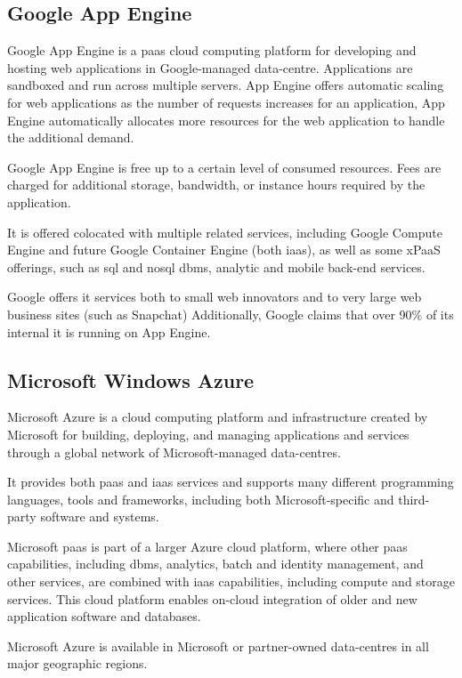 \subsection*{Google App Engine}
\label{sec:problemSpace-cloudPlatform-gae}
Google App Engine is a \ac{paas} cloud computing platform for developing and hosting web applications
in Google-managed data-centre. Applications are sandboxed and run across multiple servers. App Engine
offers automatic scaling for web applications as the number of requests increases for an application,
App Engine automatically allocates more resources for the web application to handle the additional
demand.

Google App Engine is free up to a certain level of consumed resources. Fees are charged for additional
storage, bandwidth, or instance hours required by the application.

It is offered colocated with multiple related services, including Google Compute Engine and future
Google Container Engine (both \ac{iaas}), as well as some xPaaS offerings, such as \acs{sql} and
\acs{nosql} \acs{dbms}, analytic and mobile back-end services.

Google offers it services both to small web innovators and to very large web business sites (such as
Snapchat) Additionally, Google claims that over 90\% of its internal \acs{it} is running on App Engine.

\subsection*{Microsoft Windows Azure}
\label{sec:problemSpace-cloudPlatform-azure}
Microsoft Azure is a cloud computing platform and infrastructure created by Microsoft for building, 
deploying, and managing applications and services through a global network of Microsoft-managed
data-centres.

It provides both \ac{paas} and \ac{iaas} services and supports many different programming languages,
tools and frameworks, including both Microsoft-specific and third-party software and systems.

Microsoft \ac{paas} is part of a larger Azure cloud platform, where other \ac{paas} capabilities,
including \acs{dbms}, analytics, batch and identity management, and other services, are combined with
\ac{iaas} capabilities, including compute and storage services. This cloud platform enables on-cloud
integration of older and new application software and databases.

Microsoft Azure is available in Microsoft or partner-owned data-centres in all major geographic regions.

